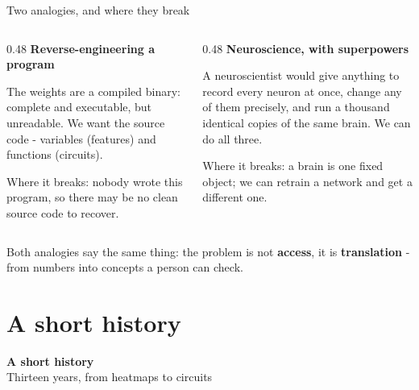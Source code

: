 \documentclass[aspectratio=169]{beamer}
\newcommand{\keybox}[1]{%
  \begin{tcolorbox}[colback=armblue!8, colframe=armblue, boxrule=0.6pt, arc=2pt]
  #1
  \end{tcolorbox}}
\newcommand{\sectiontransition}[2]{%
  \begin{frame}[plain]
    \vfill
    \begin{center}
      {\Huge\bfseries\color{popblue} #1}\\[1.1em]
      {\large #2}
    \end{center}
    \vfill
  \end{frame}}
\begin{document}
\begin{frame}{Two analogies, and where they break}
  \vspace{0.3em}
  \begin{columns}[T]
    \begin{column}{0.48\textwidth}
      \textbf{Reverse-engineering a program}

      \vspace{0.3em}
      {\small The weights are a compiled binary: complete and executable, but unreadable. We want
      the source code - variables (features) and functions (circuits).}

      \vspace{0.4em}
      {\small\color{armred} Where it breaks: nobody wrote this program, so there may be no clean
      source code to recover.}
    \end{column}
    \begin{column}{0.48\textwidth}
      \textbf{Neuroscience, with superpowers}

      \vspace{0.3em}
      {\small A neuroscientist would give anything to record every neuron at once, change any of
      them precisely, and run a thousand identical copies of the same brain. We can do all three.}

      \vspace{0.4em}
      {\small\color{armred} Where it breaks: a brain is one fixed object; we can retrain a
      network and get a different one.}
    \end{column}
  \end{columns}

  \vspace{1.0em}
  \keybox{Both analogies say the same thing: the problem is not \textbf{access}, it is
  \textbf{translation} - from numbers into concepts a person can check.}
\end{frame}

\section{A short history}
\sectiontransition{A short history}{Thirteen years, from heatmaps to circuits}
\end{document}
